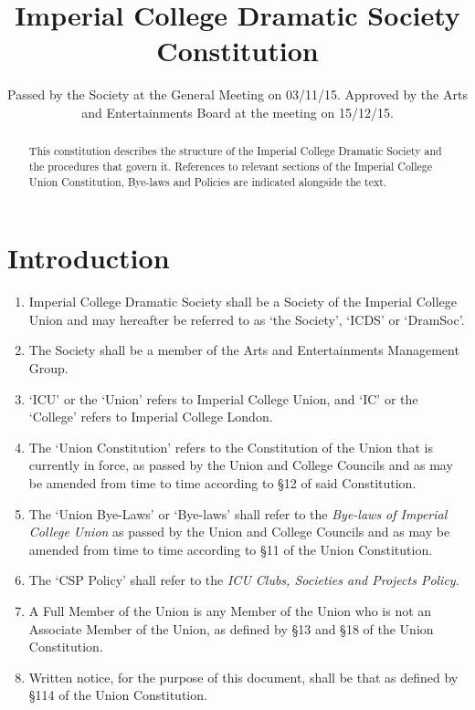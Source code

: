 \documentclass[a4paper]{tufte-handout}
\title{Imperial College Dramatic Society Constitution}
\date{Passed by the Society at the General Meeting on 03/11/15. Approved by the Arts and Entertainments Board at the meeting on 15/12/15.}
\newcommand{\policyOffset}{12pt}
\newcommand{\policyCspp}[2][\policyOffset]{\marginnote[#1]{\textsc{CSP Policy \S#2}}}
\begin{document}
\maketitle

\begin{fullwidth}
\itshape

\begin{abstract}
This constitution describes the structure of the Imperial College Dramatic Society and the procedures that govern it.
References to relevant sections of the Imperial College Union Constitution, Bye-laws and Policies are indicated alongside the text.
\end{abstract}
\end{fullwidth}

\hdashrule{15cm}{1.1pt}{1.1pt}

\section{Introduction}
\begin{enumerate}
    \item Imperial College Dramatic Society shall be a Society of the Imperial College Union and may hereafter be referred to as `the Society', `ICDS' or `DramSoc'.
    \item \policyCspp{33} The Society shall be a member of the Arts and Entertainments Management Group.
    \item `ICU' or the `Union' refers to Imperial College Union, and `IC' or the `College' refers to Imperial College London.
    \item The `Union Constitution' refers to the Constitution of the Union that is currently in force, as passed by the Union and College Councils and as may be amended from time to time according to \S12 of said Constitution.
    \item The `Union Bye-Laws' or `Bye-laws' shall refer to the \textit{Bye-laws of Imperial College Union} as passed by the Union and College Councils and as may be amended from time to time according to \S11 of the Union Constitution.
    \item The `CSP Policy' shall refer to the \textit{ICU Clubs, Societies and Projects Policy}.
    \item A Full Member of the Union is any Member of the Union who is not an Associate Member of the Union, as defined by \S13 and \S18 of the Union Constitution.
    \item Written notice, for the purpose of this document, shall be that as defined by \S114 of the Union Constitution.
\end{enumerate}
\end{document}
